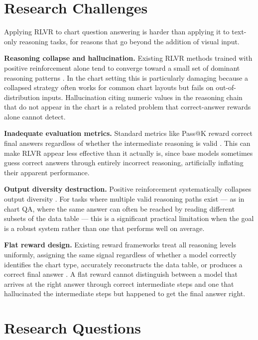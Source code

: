 \documentclass{iutbscthesis}
\begin{document}
\section{Research Challenges}

Applying RLVR to chart question answering is harder than applying it to text-only reasoning tasks, for reasons that go beyond the addition of visual input.

\textbf{Reasoning collapse and hallucination.} Existing RLVR methods trained with positive reinforcement alone tend to converge toward a small set of dominant reasoning patterns \cite{sinha2025chartrvr, wen2025rlvr}. In the chart setting this is particularly damaging because a collapsed strategy often works for common chart layouts but fails on out-of-distribution inputs. Hallucination citing numeric values in the reasoning chain that do not appear in the chart is a related problem that correct-answer rewards alone cannot detect.

\textbf{Inadequate evaluation metrics.} Standard metrics like Pass@K reward correct final answers regardless of whether the intermediate reasoning is valid \cite{wen2025rlvr, zhu2025rlvrdecomposed}. This can make RLVR appear less effective than it actually is, since base models sometimes guess correct answers through entirely incorrect reasoning, artificially inflating their apparent performance.

\textbf{Output diversity destruction.} Positive reinforcement systematically collapses output diversity \cite{zhu2025rlvrdecomposed, sinha2025chartrvr}. For tasks where multiple valid reasoning paths exist --- as in chart QA, where the same answer can often be reached by reading different subsets of the data table --- this is a significant practical limitation when the goal is a robust system rather than one that performs well on average.

\textbf{Flat reward design.} Existing reward frameworks treat all reasoning levels uniformly, assigning the same signal regardless of whether a model correctly identifies the chart type, accurately reconstructs the data table, or produces a correct final answer \cite{sinha2025chartrvr}. A flat reward cannot distinguish between a model that arrives at the right answer through correct intermediate steps and one that hallucinated the intermediate steps but happened to get the final answer right.

\section{Research Questions}
\end{document}
